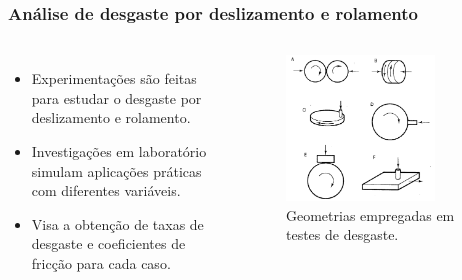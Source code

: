 \documentclass{beamer}
\begin{document}
\begin{frame}
\frametitle{Análise de desgaste por deslizamento e rolamento}

\begin{columns}[c] %
	\begin{itemize}
		\item Experimentações são feitas para estudar o desgaste por deslizamento e rolamento.
		\item Investigações em laboratório simulam aplicações práticas com diferentes variáveis.
		\item Visa a obtenção de taxas de desgaste e coeficientes de fricção para cada caso.
	\end{itemize}

\begin{figure}
	\centering
	\includegraphics[width=0.8\textwidth]{testes_desgaste}
	\caption{Geometrias empregadas em testes de desgaste.}
	\label{fig:testes_desgaste}
\end{figure}
\end{columns}


\end{frame}
\end{document}
